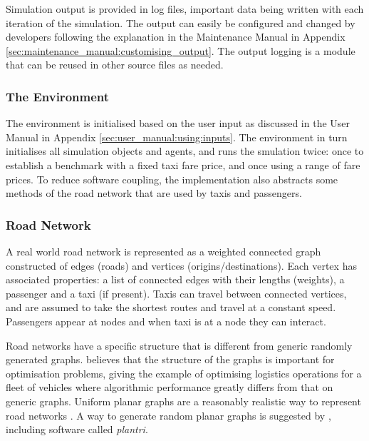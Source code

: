 Simulation output is provided in log files, important data being written with
each iteration of the simulation. The output can easily be configured and
changed by developers following the explanation in the Maintenance Manual in
Appendix \ref{sec:maintenance_manual:customising_output}. The output logging is
a module that can be reused in other source files as needed.


\subsubsection{The Environment}

The environment is initialised based on the user input as discussed in the User
Manual in Appendix \ref{sec:user_manual:using:inputs}. The environment in turn
initialises all simulation objects and agents, and runs the smulation twice:
once to establish a benchmark with a fixed taxi fare price, and once using a
range of fare prices. To reduce software coupling, the implementation also
abstracts some methods of the road network that are used by taxis and
passengers.


\subsubsection{Road Network}
\label{sec:design:network}

A real world road network is represented as a weighted connected graph
constructed of edges (roads) and vertices (origins/destinations). Each vertex
has associated properties: a list of connected edges with their lengths
(weights), a passenger and a taxi (if present). Taxis can travel between
connected vertices, and are assumed to take the shortest routes and travel at a
constant speed. Passengers appear at nodes and when taxi is at a node  they can
interact.

Road networks have a specific structure that is different from generic randomly
generated graphs. \textcite{Eisenstat2011graphs+quadtree} believes that the
structure of the graphs is important for optimisation problems, giving the
example of optimising logistics operations for a fleet of vehicles where
algorithmic performance greatly differs from that on generic graphs. Uniform
planar graphs are a reasonably realistic way to represent road networks
\parencite{Eisenstat2011graphs+quadtree, Masucci2009graphs+london}. A way to
generate random planar graphs is suggested by
\textcite{Brinkmann2007graphs+generate}, including software called
\textit{plantri}.

